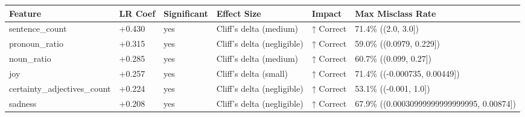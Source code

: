 \begin{tabular}{llllll}
\toprule
Feature & LR Coef & Significant & Effect Size & Impact & Max Misclass Rate \\
\midrule
sentence\_count & +0.430 & yes & Cliff's delta (medium) & ↑ Correct & 71.4\% ((2.0, 3.0]) \\
pronoun\_ratio & +0.315 & yes & Cliff's delta (negligible) & ↑ Correct & 59.0\% ((0.0979, 0.229]) \\
noun\_ratio & +0.285 & yes & Cliff's delta (medium) & ↑ Correct & 60.7\% ((0.099, 0.27]) \\
joy & +0.257 & yes & Cliff's delta (small) & ↑ Correct & 71.4\% ((-0.000735, 0.00449]) \\
certainty\_adjectives\_count & +0.224 & yes & Cliff's delta (negligible) & ↑ Correct & 53.1\% ((-0.001, 1.0]) \\
sadness & +0.208 & yes & Cliff's delta (negligible) & ↑ Correct & 67.9\% ((0.00030999999999999995, 0.00874]) \\
\bottomrule
\end{tabular}
